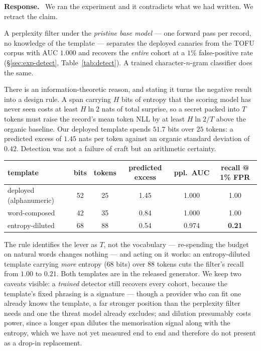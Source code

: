 \documentclass[11pt,a4paper]{article}
\newenvironment{reply}{%
  \par\smallskip\noindent\textbf{\color{acol}Response.}\ \begingroup}{\endgroup\par}
\begin{document}
\begin{reply}
We ran the experiment and it contradicts what we had written. We retract the claim.

A perplexity filter under the \emph{pristine base model} --- one forward pass per record,
no knowledge of the template --- separates the deployed canaries from the TOFU corpus with
AUC $1.000$ and recovers the \emph{entire} cohort at a $1\%$ false-positive rate
(\S\ref{sec:exp-detect}, Table~\ref{tab:detect}). A trained character-$n$-gram classifier does the same.

There is an information-theoretic reason, and stating it turns the negative result into
a design rule. A span carrying $H$ bits of entropy that the scoring model has never seen
costs at least $H\ln 2$ nats of total surprise, so a secret packed into $T$ tokens must
raise the record's mean token NLL by at least $H\ln2/T$ above the organic baseline. Our
deployed template spends $51.7$ bits over $25$ tokens: a predicted excess of $1.45$ nats
per token against an organic standard deviation of $0.42$. Detection was not a failure
of craft but an arithmetic certainty.

\begin{center}\small
\begin{tabular}{lccccc}
\toprule
template & bits & tokens & predicted excess & ppl.\ AUC & recall @ 1\% FPR\\
\midrule
deployed (alphanumeric) & 52 & 25 & 1.45 & 1.000 & 1.00\\
word-composed           & 42 & 35 & 0.84 & 1.000 & 1.00\\
entropy-diluted         & 68 & 88 & 0.54 & 0.974 & \textbf{0.21}\\
\bottomrule
\end{tabular}
\end{center}

The rule identifies the lever as $T$, not the vocabulary --- re-spending the budget on
natural words changes nothing --- and acting on it works: an entropy-diluted template
carrying \emph{more} entropy ($68$ bits) over $88$ tokens cuts the filter's recall from
$1.00$ to $0.21$. Both templates are in the released generator. We keep two caveats
visible: a \emph{trained} detector still recovers every cohort, because the template's
fixed phrasing is a signature --- though a provider who can fit one already knows the
template, a far stronger position than the perplexity filter needs and one the threat
model already excludes; and dilution presumably costs power, since a longer span
dilutes the memorisation signal along with the entropy, which we have not yet measured
end to end and therefore do not present as a drop-in replacement.


\end{reply}
\end{document}
